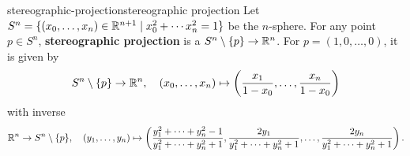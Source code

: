 \begin{topic}{stereographic-projection}{stereographic projection}
    Let $S^n = \{ (x_0, \ldots, x_n) \in \mathbb{R}^{n + 1} \mid x_0^2 + \cdots x_n^2 = 1 \}$ be the $n$-sphere. For any point $p \in S^n$, \textbf{stereographic projection} is a  $S^n \setminus \{ p \} \to \mathbb{R}^n$. For $p = (1, 0, \ldots, 0)$, it is given by
    \[ S^n \setminus \{ p \} \to \mathbb{R}^n, \quad (x_0, \ldots, x_n) \mapsto \left(\frac{x_1}{1 - x_0}, \ldots, \frac{x_n}{1 - x_0}\right) \]
    with inverse
    \[ \mathbb{R}^n \to S^n \setminus \{ p \}, \quad (y_1, \ldots, y_n) \mapsto \left(\frac{y_1^2 + \cdots + y_n^2 - 1}{y_1^2 + \cdots + y_n^2 + 1}, \frac{2 y_1}{y_1^2 + \cdots + y_n^2 + 1}, \ldots, \frac{2 y_n}{y_1^2 + \cdots + y_n^2 + 1}\right) . \]
\end{topic}
